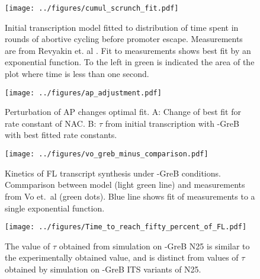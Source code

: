 \begin{figure}
    \begin{center}
      \texttt{[image: ../figures/cumul\_scrunch\_fit.pdf]}
    \end{center}
    \caption{Initial transcription model fitted to distribution of time spent
      in rounds of abortive cycling before promoter escape. Measurements are
      from Revyakin et. al \cite{revyakin_abortive_2006}. Fit to measurements
      shows best fit by an exponential function. To the left in green is
      indicated the area of the plot where time is less than one second.}
\label{fig:revyakin_fit}
\end{figure}


\begin{figure}
    \begin{center}
        \texttt{[image: ../figures/ap\_adjustment.pdf]}
    \end{center}
    \caption{Perturbation of AP changes optimal fit.  A: Change of best fit
      for rate constant of NAC. B: $\tau$ from initial transcription with
    -GreB with best fitted rate constants.}
\label{fig:ap_adjustment}
\end{figure}


\begin{figure}
    \begin{center}
        \texttt{[image: ../figures/vo\_greb\_minus\_comparison.pdf]}
    \end{center}
    \caption{Kinetics of FL transcript synthesis under -GreB conditions.
      Commparison between model (light green line) and measurements from Vo
      et.\ al \cite{vo_vitro_2003-1} (green dots). Blue line shows fit of
      measurements to a single exponential function.}
\label{fig:vo_comparison}
\end{figure}


\begin{figure}
    \begin{center}
      \texttt{[image: ../figures/Time\_to\_reach\_fifty\_percent\_of\_FL.pdf]}
    \end{center}
    \caption{The value of $\tau$ obtained from simulation on -GreB N25 is
      similar to the experimentally obtained value, and is distinct from
      values of $\tau$ obtained by simulation on -GreB ITS variants of N25.}
\label{fig:vo_comparison}
\end{figure}


